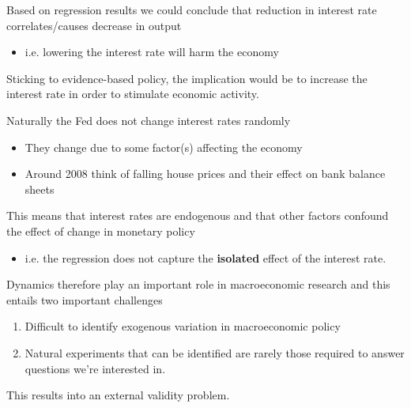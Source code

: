 \documentclass{beamer}
\begin{document}
\begin{frame}
 Based on regression results we could conclude that reduction in interest rate correlates/causes decrease in output
 \begin{itemize}
   \item i.e. lowering the interest rate will harm the economy
 \end{itemize}
 \medskip
 Sticking to evidence-based policy, the implication would be to increase the interest rate in order to stimulate economic activity.
\end{frame}

\begin{frame}
  Naturally the Fed does not change interest rates randomly
  \begin{itemize}
    \item They change due to some factor(s) affecting the economy
    \item Around 2008 think of falling house prices and their effect on bank balance sheets
  \end{itemize}
  \medskip
  This means that interest rates are endogenous and that other factors confound the effect of change in monetary policy
  \begin{itemize}
    \item i.e. the regression does not capture the \textbf{isolated} effect of the interest rate.
  \end{itemize}
\end{frame}

\begin{frame}
  Dynamics therefore play an important role in macroeconomic research and this entails two important challenges  
  \begin{enumerate}
    \item Difficult to identify exogenous variation in macroeconomic policy
    \item Natural experiments that can be identified are rarely those required to answer questions we're interested in. 
  \end{enumerate}
  \medskip
  This results into an external validity problem.  
\end{frame}
\end{document}
